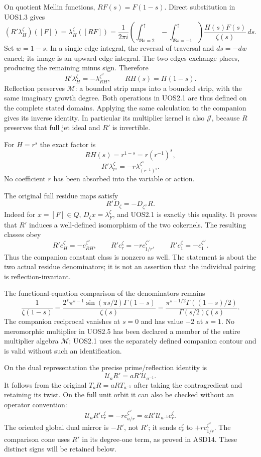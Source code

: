 On quotient Mellin functions, \(RF(s)=F(1-s)\). Direct substitution in
UOS1.3 gives \[
 (R'\lambda_H^\zeta)([F])
 =\lambda_H^\zeta([RF])
 =\frac1{2\pi i}\left(\int_{\Re s=2}^{\uparrow}
        -\int_{\Re s=-1}^{\uparrow}\right)
        \frac{H(s)F(s)}{\zeta(s)}\,ds.
\] Set \(w=1-s\). In a single edge integral, the reversal of traversal
and \(ds=-dw\) cancel; its image is an upward edge integral. The two
edges exchange places, producing the remaining minus sign. Therefore \[
 \boxed{R'\lambda_H^\zeta
   =-\lambda_{RH}^{\zeta^\vee},\qquad
   RH(s)=H(1-s).}
 \tag{UOS2.1}
\] Reflection preserves \(\mathcal M\): a bounded strip maps into a
bounded strip, with the same imaginary growth degree. Both operations in
UOS2.1 are thus defined on the complete stated domains. Applying the
same calculation to the companion gives its inverse identity. In
particular its multiplier kernel is also \(\mathcal J\), because \(R\)
preserves that full jet ideal and \(R'\) is invertible.

For \(H=r^s\) the exact factor is \[
 RH(s)=r^{1-s}=r(r^{-1})^s,
\] \[
 \boxed{R'\lambda_{r^s}^\zeta
   =-r\lambda_{(r^{-1})^s}^{\zeta^\vee}.}
 \tag{UOS2.2}
\] No coefficient \(r\) has been absorbed into the variable or action.

The original full residue maps satisfy \[
 R'D_\zeta=-D_{\zeta^\vee}R.
 \tag{UOS2.3}
\] Indeed for \(x=[F]\in Q\), \(D_\zeta x=\lambda_F^\zeta\), and UOS2.1
is exactly this equality. It proves that \(R'\) induces a well-defined
isomorphism of the two cokernels. The resulting classes obey \[
 R'c_H^\zeta=-c_{RH}^{\zeta^\vee},\qquad
 R'c_r^\zeta=-r c_{1/r}^{\zeta^\vee},\qquad
 R'c_1^\zeta=-c_1^{\zeta^\vee}.
 \tag{UOS2.4}
\] Thus the companion constant class is nonzero as well. The statement
is about the two actual residue denominators; it is not an assertion
that the individual pairing is reflection-invariant.

The functional-equation comparison of the denominators remains \[
 \frac1{\zeta(1-s)}
 =\frac{2^s\pi^{s-1}\sin(\pi s/2)\Gamma(1-s)}{\zeta(s)}
 =\frac{\pi^{s-1/2}\Gamma((1-s)/2)}
        {\Gamma(s/2)\zeta(s)}.
 \tag{UOS2.5}
\] The companion reciprocal vanishes at \(s=0\) and has value \(-2\) at
\(s=1\). No meromorphic multiplier in UOS2.5 has been declared a member
of the entire multiplier algebra \(\mathcal M\); UOS2.1 uses the
separately defined companion contour and is valid without such an
identification.

On the dual representation the precise prime/reflection identity is \[
 \boxed{\mathcal U_a R'=aR'\mathcal U_{a^{-1}}.}
 \tag{UOS2.6}
\] It follows from the original \(T_aR=aRT_{a^{-1}}\) after taking the
contragredient and retaining its twist. On the full unit orbit it can
also be checked without an operator convention: \[
 \mathcal U_aR'c_r^\zeta
 =-r c_{a/r}^{\zeta^\vee}
 =aR'\mathcal U_{a^{-1}}c_r^\zeta.
\] The oriented global dual mirror is \(-R'\), not \(R'\); it sends
\(c_r^\zeta\) to \(+r c_{1/r}^{\zeta^\vee}\). The comparison cone uses
\(R'\) in its degree-one term, as proved in ASD14. These distinct signs
will be retained below.

